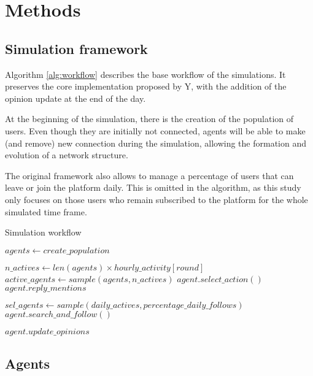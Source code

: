 \section{Methods}
\label{sec:methods}


\subsection{Simulation framework}
Algorithm \ref{alg:workflow} describes the base workflow of the simulations. It preserves the core implementation proposed by Y, with the addition of the opinion update at the end of the day.

At the beginning of the simulation, there is the creation of the population of users. Even though they are initially not connected, agents will be able to make (and remove) new connection during the simulation, allowing the formation and evolution of a network structure.

The original framework also allows to manage a percentage of users that can leave or join the platform daily. This is omitted in the algorithm, as this study only focuses on those users who remain subscribed to the platform for the whole simulated time frame. 

\begin{algorithm}
\caption{Simulation workflow}
\label{alg:workflow}
\begin{algorithmic}[1]
\STATE $agents \gets create\_population$

        \STATE $n\_actives \gets len(agents) \times hourly\_activity[round]$
        \STATE $active\_agents \gets sample(agents, n\_actives)$ 
            \STATE $agent.select\_action()$
            \STATE $agent.reply\_mentions$
        \ENDFOR
    \ENDFOR

    \STATE $sel\_agents \gets sample(daily\_actives, percentage\_daily\_follows)$
        \STATE $agent.search\_and\_follow()$
    \ENDFOR
    
        \STATE $agent.update\_opinions$
    \ENDFOR

\ENDFOR
\end{algorithmic}
\end{algorithm}



\subsection{Agents}
